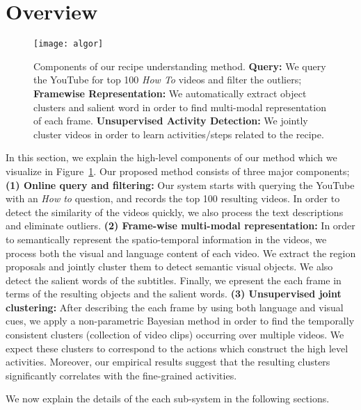 \section{Overview}
\label{sec:overview}
\begin{figure}[t]
  \texttt{[image: algor]}
  \caption{Components of our recipe understanding method. \textbf{Query:} We query the YouTube for top 100 \emph{How To} videos and filter the outliers; \textbf{Framewise Representation:} We automatically extract object clusters and salient word in order to find multi-modal representation of each frame. \textbf{Unsupervised Activity Detection:} We jointly cluster videos in order to learn activities/steps related to the recipe.}
\label{fig:overview}
\end{figure}

In this section, we explain the high-level components of our method which we visualize in Figure~\ref{fig:overview}. Our proposed method consists of three major components; \textbf{(1) Online query and filtering:} Our system starts with querying the YouTube with an \emph{How to} question, and records the top 100 resulting videos. In order to detect the similarity of the videos quickly, we also process the text descriptions and eliminate outliers. \textbf{(2) Frame-wise multi-modal representation:} In order to semantically represent the spatio-temporal information in the videos, we process both the visual and language content of each video. We extract the region proposals and jointly cluster them to detect semantic visual objects. We also detect the salient words of the subtitles. Finally, we epresent the each frame in terms of the resulting objects and the salient words. \textbf{(3) Unsupervised joint clustering:} After describing the each frame by using both language and visual cues, we apply a non-parametric Bayesian method in order to find the temporally consistent clusters (collection of video clips) occurring over multiple videos. We expect these clusters to correspond to the actions which construct the high level activities. Moreover, our empirical results suggest that the resulting clusters significantly correlates with the fine-grained activities.

We now explain the details of the each sub-system in the following sections.
